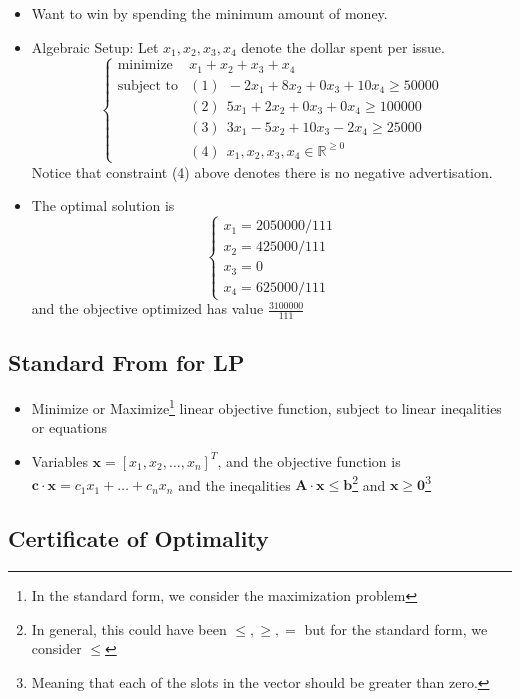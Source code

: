 \documentclass[10pt]{article}
\newcommand{\real}{\mathbb{R}}
\newcommand{\bx}{\mathbf{x}}
\begin{document}
\begin{itemize}
    \item Want to win by spending the minimum amount of money.
    \item Algebraic Setup: Let $x_1,x_2,x_3,x_4$ denote the dollar spent per issue. 
        $$
        \begin{cases}
            \text{minimize} &x_1 + x_2 + x_3 + x_4 \\
            \text{subject to} &(1)~~ -2x_1 + 8x_2 + 0x_3 + 10x_4 \geq 50000 \\
            &(2)~~5x_1 +2x_2 +0x_3 +0x_4 \geq 100000 \\
            &(3)~~ 3x_1 - 5x_2 + 10x_3 - 2x_4 \geq 25000 \\
            &(4)~~ x_1,x_2,x_3,x_4 \in \real^{\geq 0}
        \end{cases}
        $$
    Notice that constraint (4) above denotes there is no negative advertisation. 
    \item The optimal solution is 
        $$
        \begin{cases}
            x_1 = 2050000/111 \\
            x_2 = 425000/111 \\
            x_3 = 0 \\
            x_4 = 625000/111
        \end{cases}
        $$
        and the objective optimized has value $\frac{3100000}{111}$
\end{itemize}

\subsection{Standard From for LP}
\begin{itemize}
    \item Minimize or Maximize\footnote{In the standard form, we consider the maximization problem} linear objective function, subject to linear ineqalities or equations
    \item Variables $\bx = [x_1,x_2,\dots,x_n]^T$, and the objective function is $\mathbf{c} \cdot \bx = c_1x_1 + \dots + c_nx_n$ and the ineqalities $\mathbf{A}\cdot \bx \leq \mathbf{b}$\footnote{In general, this could have been $\leq, \geq, =$ but for the standard form, we consider $\leq$} and $\bx \geq \mathbf{0}$\footnote{Meaning that each of the slots in the vector should be greater than zero.}
\end{itemize}

\subsection{Certificate of Optimality}
\end{document}
